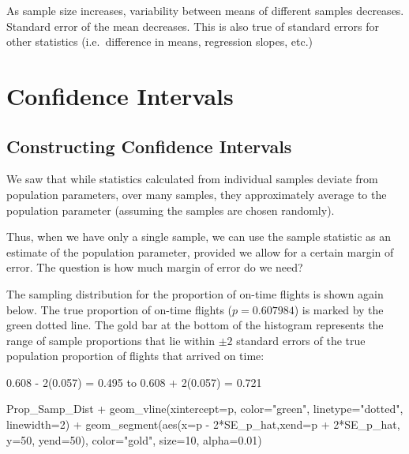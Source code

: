 \documentclass[
  letterpaper,
  DIV=11,
  numbers=noendperiod]{scrreprt}
\newenvironment{Shaded}{\begin{snugshade}}{\end{snugshade}}
\newcommand{\AttributeTok}[1]{\textcolor[rgb]{0.40,0.45,0.13}{#1}}
\newcommand{\DecValTok}[1]{\textcolor[rgb]{0.68,0.00,0.00}{#1}}
\newcommand{\FloatTok}[1]{\textcolor[rgb]{0.68,0.00,0.00}{#1}}
\newcommand{\FunctionTok}[1]{\textcolor[rgb]{0.28,0.35,0.67}{#1}}
\newcommand{\NormalTok}[1]{\textcolor[rgb]{0.00,0.23,0.31}{#1}}
\newcommand{\SpecialCharTok}[1]{\textcolor[rgb]{0.37,0.37,0.37}{#1}}
\newcommand{\StringTok}[1]{\textcolor[rgb]{0.13,0.47,0.30}{#1}}
\begin{document}
As sample size increases, variability between means of different samples
decreases. Standard error of the mean decreases. This is also true of
standard errors for other statistics (i.e.~difference in means,
regression slopes, etc.)

\section{Confidence Intervals}\label{confidence-intervals}

\subsection{Constructing Confidence
Intervals}\label{constructing-confidence-intervals}

We saw that while statistics calculated from individual samples deviate
from population parameters, over many samples, they approximately
average to the population parameter (assuming the samples are chosen
randomly).

Thus, when we have only a single sample, we can use the sample statistic
as an estimate of the population parameter, provided we allow for a
certain margin of error. The question is how much margin of error do we
need?

The sampling distribution for the proportion of on-time flights is shown
again below. The true proportion of on-time flights (\(p=0.607984\)) is
marked by the green dotted line. The gold bar at the bottom of the
histogram represents the range of sample proportions that lie within
\(\pm 2\) standard errors of the true population proportion of flights
that arrived on time:

0.608 - 2(0.057) = 0.495 to 0.608 + 2(0.057) = 0.721

\begin{Shaded}
\begin{Highlighting}[]
\NormalTok{Prop\_Samp\_Dist }\SpecialCharTok{+} \FunctionTok{geom\_vline}\NormalTok{(}\AttributeTok{xintercept=}\NormalTok{p, }\AttributeTok{color=}\StringTok{"green"}\NormalTok{, }\AttributeTok{linetype=}\StringTok{"dotted"}\NormalTok{, }\AttributeTok{linewidth=}\DecValTok{2}\NormalTok{) }\SpecialCharTok{+} \FunctionTok{geom\_segment}\NormalTok{(}\FunctionTok{aes}\NormalTok{(}\AttributeTok{x=}\NormalTok{p }\SpecialCharTok{{-}} \DecValTok{2}\SpecialCharTok{*}\NormalTok{SE\_p\_hat,}\AttributeTok{xend=}\NormalTok{p }\SpecialCharTok{+} \DecValTok{2}\SpecialCharTok{*}\NormalTok{SE\_p\_hat, }\AttributeTok{y=}\DecValTok{50}\NormalTok{, }\AttributeTok{yend=}\DecValTok{50}\NormalTok{), }\AttributeTok{color=}\StringTok{"gold"}\NormalTok{, }\AttributeTok{size=}\DecValTok{10}\NormalTok{, }\AttributeTok{alpha=}\FloatTok{0.01}\NormalTok{) }
\end{Highlighting}
\end{Shaded}
\end{document}
